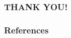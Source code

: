 \documentclass[11pt]{beamer}
\begin{document}
\begin{frame}[t]
\frametitle{THANK YOU!}
\note{~}
\end{frame}









 {
    \begin{frame}
        \frametitle{}
    \end{frame}

}

\begin{frame}[allowframebreaks]
    \frametitle{References}
    \renewcommand{\bibfont}{\normalfont\footnotesize}
    \printbibliography
\end{frame}
\end{document}
